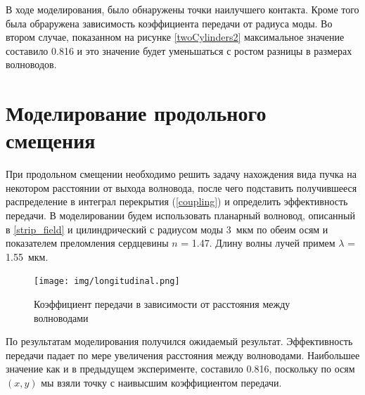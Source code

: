 В ходе моделирования, было обнаружены точки наилучшего контакта. Кроме того была обраружена зависимость коэффициента передачи от радиуса моды. Во втором случае, показанном на рисунке \ref{twoCylinders2} максимальное значение составило 0.816 и это значение будет уменьшаться с ростом разницы в размерах волноводов.

\section{Моделирование продольного смещения}

При продольном смещении необходимо решить задачу нахождения вида пучка на некотором расстоянии от выхода волновода, после чего подставить получившееся распределение в интеграл перекрытия (\ref{coupling}) и определить эффективность передачи.
В моделировании будем использовать планарный волновод, описанный в \ref{strip_field} и цилиндрический с радиусом моды 3~мкм по обеим осям и показателем преломления сердцевины $n$ = 1.47. Длину волны лучей примем $\lambda$ = 1.55~мкм.

\begin{figure}[h!]
	\texttt{[image: img/longitudinal.png]}
	\caption{Коэффициент передачи в зависимости от расстояния между волноводами}
	\label{longitudinal}
\end{figure}

По результатам моделирования получился ожидаемый результат. Эффективность передачи падает по мере увеличения расстояния между волноводами. Наибольшее значение как и в предыдущем эксперименте, составило 0.816, поскольку по осям $(x,y)$ мы взяли точку с наивысшим коэффициентом передачи.   